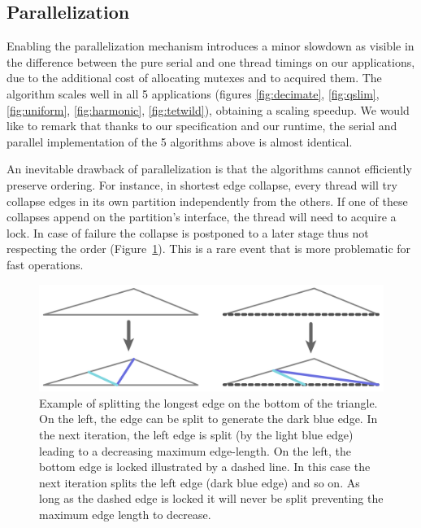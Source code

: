 \subsection{Parallelization}
{
Enabling the parallelization mechanism introduces a minor slowdown as visible in the difference between the pure serial and one thread timings on our applications, due to the additional cost of allocating mutexes and to acquired them. The algorithm scales well in all 5 applications (figures \ref{fig:decimate}, \ref{fig:qslim}, \ref{fig:uniform}, \ref{fig:harmonic}, \ref{fig:tetwild}), obtaining a scaling speedup. 
We would like to remark that thanks to our specification and our runtime, the serial and parallel implementation of the 5 algorithms above is almost identical.}

{An inevitable drawback of parallelization is that the algorithms cannot efficiently preserve ordering. For instance, in shortest edge collapse, every thread will try collapse edges in its own partition independently from the others. If one of these collapses append on the partition's interface, the thread will need to acquire a lock. In case of failure the collapse is postponed to a later stage thus not respecting the order (Figure~\ref{fig:limitation}). This is a rare event that is more problematic for fast operations.}


\begin{figure}\centering\footnotesize
    \includegraphics[width=\linewidth]{wmtk-tex/figs/limitation-of-para.pdf}
    \caption{{Example of splitting the longest edge on the bottom of the triangle. On the left, the edge can be split to generate the dark blue edge. In the next iteration, the left edge is split (by the light blue edge) leading to a decreasing maximum edge-length. On the left, the bottom edge is locked illustrated by a dashed line. In this case the next iteration splits the left edge (dark blue edge) and so on. As long as the dashed edge is locked it will never be split preventing the maximum edge length to decrease.}}
    \label{fig:limitation}
\end{figure}

